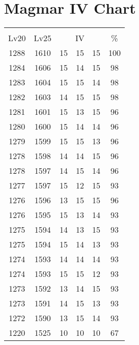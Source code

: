 \documentclass{article}%
\begin{document}
%
\normalsize%
\section{Magmar IV Chart}%
\label{sec:Magmar IV Chart}%
\renewcommand{\arraystretch}{1.5}%
\begin{tabular}{|c|c|c|c|c|c|}%
\hline%
\multicolumn{6}{|c|}{\textcolor{white}{ 
\linebreak{Magmar}
}%
\cellcolor{black}}\\%
\multicolumn{1}{|c}{Lv20}&\multicolumn{1}{c|}{Lv25}&\multicolumn{3}{c|}{IV}&\multicolumn{1}{|c|}{\%}\\%
\hline%
\rowcolor{color100}%
1288&1610&15&15&15&100\\%
\hline%
\rowcolor{color98}%
1284&1606&15&14&15&98\\%
\hline%
\rowcolor{color98}%
1283&1604&15&15&14&98\\%
\hline%
\rowcolor{color98}%
1282&1603&14&15&15&98\\%
\hline%
\rowcolor{color96}%
1281&1601&15&13&15&96\\%
\hline%
\rowcolor{color96}%
1280&1600&15&14&14&96\\%
\hline%
\rowcolor{color96}%
1279&1599&15&15&13&96\\%
\hline%
\rowcolor{color96}%
1278&1598&14&14&15&96\\%
\hline%
\rowcolor{color96}%
1278&1597&14&15&14&96\\%
\hline%
\rowcolor{color93}%
1277&1597&15&12&15&93\\%
\hline%
\rowcolor{color96}%
1276&1596&13&15&15&96\\%
\hline%
\rowcolor{color93}%
1276&1595&15&13&14&93\\%
\hline%
\rowcolor{color93}%
1275&1594&14&13&15&93\\%
\hline%
\rowcolor{color93}%
1275&1594&15&14&13&93\\%
\hline%
\rowcolor{color93}%
1274&1593&14&14&14&93\\%
\hline%
\rowcolor{color93}%
1274&1593&15&15&12&93\\%
\hline%
\rowcolor{color93}%
1273&1592&13&14&15&93\\%
\hline%
\rowcolor{color93}%
1273&1591&14&15&13&93\\%
\hline%
\rowcolor{color93}%
1272&1590&13&15&14&93\\%
\hline%
\rowcolor{color91}%
1220&1525&10&10&10&67\\%
\end{tabular}

%
\end{document}
